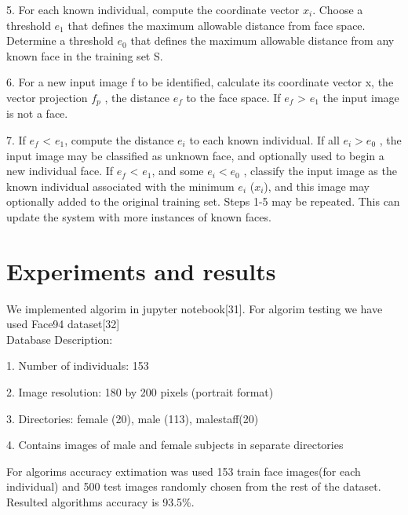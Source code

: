 5. For each known individual, compute the 
coordinate vector $x_i$. Choose a 
threshold $e_1$ that  defines the  maximum 
allowable  distance from face  space. Determine  a  threshold  $e_0$ that defines
the  maximum allowable  distance  from 
any known face in the training set S.\par
6. For a new input image f to be identified, 
calculate  its coordinate  vector x, the  vector projection $f_p$ , the 
distance $e_f$ to the face space.
If $e_f$ >  $e_1$ the input image is not a face. \par
7. If $e_f$ <  $e_1$, compute  the  distance $e_i$ to 
each known individual. If all $e_i >  e_0$ ,
the  input  image may be  classified  as
unknown face,  and  optionally used  to 
begin a new individual face. If $e_f$ <  $e_1$,
and  some $e_i <  e_0$ , classify the  input 
image as the  known individual 
associated  with the  minimum $e_i$ ($x_i$),
and this image may optionally added to 
the  original training set. Steps 1­-5 may 
be repeated. This can update the system with more instances of known faces.
\section{Experiments and results}
We implemented algorim in jupyter notebook[31].
For algorim testing we have used Face94 dataset[32] \\
Database Description:\par
1. Number of individuals: 153\par
2. Image resolution: 180 by 200 pixels (portrait format)\par
3. Directories: female (20), male (113), malestaff(20)\par
4. Contains images of male and female subjects in separate directories\par
For algorims accuracy extimation was used 153 train face images(for each individual) and 500 test images randomly chosen from the rest of the dataset. \\
	Resulted algorithms accuracy is 93.5\%.
